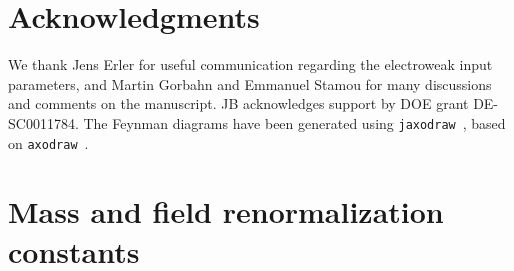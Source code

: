 \documentclass[letter,11pt,DIV=12,abstract=true,numbers=noenddot,titlepage=false,twocolumn=false,draft=false]{scrartcl}
\begin{document}
\section*{Acknowledgments}

We thank Jens Erler for useful communication regarding the electroweak
input parameters, and Martin Gorbahn and Emmanuel Stamou for many
discussions and comments on the manuscript. JB acknowledges support by
DOE grant DE-SC0011784. The Feynman diagrams have been generated using
\texttt{jaxodraw}~\cite{Binosi:2003yf}, based on
\texttt{axodraw}~\cite{Vermaseren:1994je}.

\appendix


\section{Mass and field renormalization constants}\label{sec:ren}
\end{document}
